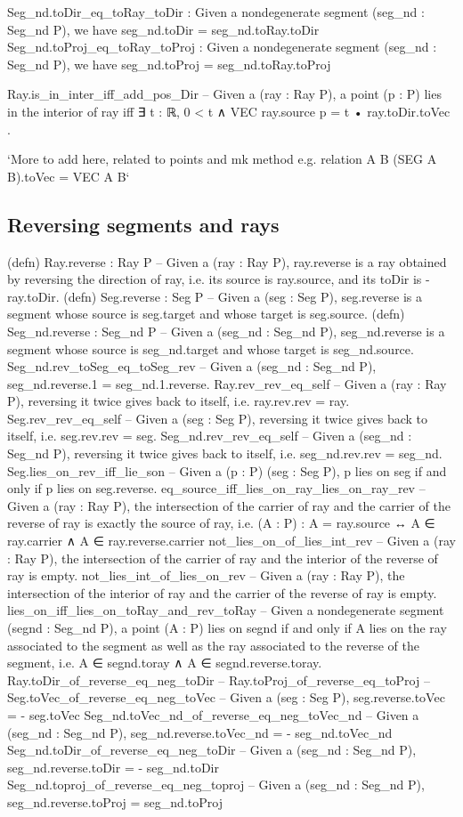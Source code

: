 \documentclass[12pt,a4paper]{article}
\begin{document}
    Seg_nd.toDir_eq_toRay_toDir : Given a nondegenerate segment (seg_nd : Seg_nd P), we have seg_nd.toDir = seg_nd.toRay.toDir
    Seg_nd.toProj_eq_toRay_toProj : Given a nondegenerate segment (seg_nd : Seg_nd P), we have seg_nd.toProj = seg_nd.toRay.toProj

    Ray.is_in_inter_iff_add_pos_Dir -- Given a (ray : Ray P), a point (p : P) lies in the interior of ray iff  ∃ t : ℝ, 0 < t ∧ VEC ray.source p = t • ray.toDir.toVec .

    `More to add here, related to points and mk method e.g. relation A B (SEG A B).toVec = VEC A B`

\subsection{Reversing segments and rays}

    (defn) Ray.reverse : Ray P -- Given a (ray : Ray P), ray.reverse is a ray obtained by reversing the direction of ray, i.e. its source is ray.source, and its toDir is - ray.toDir.
    (defn) Seg.reverse : Seg P -- Given a (seg : Seg P), seg.reverse is a segment whose source is seg.target and whose target is seg.source.
    (defn) Seg_nd.reverse : Seg_nd P -- Given a (seg_nd : Seg_nd P), seg_nd.reverse is a segment whose source is seg_nd.target and whose target is seg_nd.source.
    Seg_nd.rev_toSeg_eq_toSeg_rev -- Given a (seg_nd : Seg_nd P), seg_nd.reverse.1 = seg_nd.1.reverse.
    Ray.rev_rev_eq_self -- Given a (ray : Ray P), reversing it twice gives back to itself, i.e. ray.rev.rev = ray.
    Seg.rev_rev_eq_self -- Given a (seg : Seg P), reversing it twice gives back to itself, i.e. seg.rev.rev = seg.
    Seg_nd.rev_rev_eq_self -- Given a (seg_nd : Seg_nd P), reversing it twice gives back to itself, i.e. seg_nd.rev.rev = seg_nd.
    Seg.lies_on_rev_iff_lie_son -- Given a (p : P) (seg : Seg P), p lies on seg if and only if p lies on seg.reverse.
    eq_source_iff_lies_on_ray_lies_on_ray_rev -- Given a (ray : Ray P), the intersection of the carrier of ray and the carrier of the reverse of ray is exactly the source of ray, i.e. (A : P) : A = ray.source ↔ A ∈ ray.carrier ∧ A ∈ ray.reverse.carrier
    not_lies_on_of_lies_int_rev -- Given a (ray : Ray P), the intersection of the carrier of ray and the interior of the reverse of ray is empty.
    not_lies_int_of_lies_on_rev -- Given a (ray : Ray P), the intersection of the interior of ray and the carrier of the reverse of ray is empty.
    lies_on_iff_lies_on_toRay_and_rev_toRay -- Given a nondegenerate segment (segnd : Seg_nd P), a point (A : P) lies on segnd if and only if A lies on the ray associated to the segment as well as the ray associated to the reverse of the segment, i.e. A ∈ segnd.toray ∧ A ∈ segnd.reverse.toray.
    Ray.toDir_of_reverse_eq_neg_toDir --
    Ray.toProj_of_reverse_eq_toProj --
    Seg.toVec_of_reverse_eq_neg_toVec -- Given a (seg : Seg P), seg.reverse.toVec = - seg.toVec
    Seg_nd.toVec_nd_of_reverse_eq_neg_toVec_nd -- Given a (seg_nd : Seg_nd P), seg_nd.reverse.toVec_nd = - seg_nd.toVec_nd
    Seg_nd.toDir_of_reverse_eq_neg_toDir -- Given a (seg_nd : Seg_nd P), seg_nd.reverse.toDir = - seg_nd.toDir
    Seg_nd.toproj_of_reverse_eq_neg_toproj -- Given a (seg_nd : Seg_nd P), seg_nd.reverse.toProj = seg_nd.toProj
\end{document}
